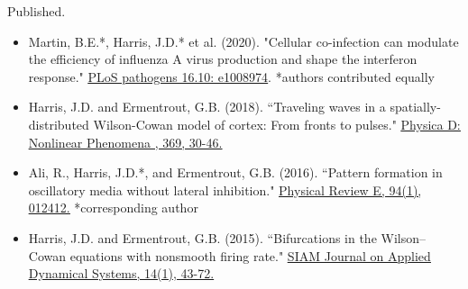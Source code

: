 \documentclass[a4paper,10pt]{article}
\newlength{\cvcolumngapwidth}
\newlength{\cvleftcolumnwidth}
\newlength{\cvrightcolumnwidth}
\newcommand{\cvtitlestyle}[1]{{\large\cvtitlefont\textcolor{cvtitlecolor}{#1}}}
\newcommand{\cvdurationstyle}[1]{{\small\cvdurationfont\textcolor{cvdurationcolor}{#1}}}
\newlength{\cvafteritemskipamount}
\newlength{\cvaftertitleskipamount}
\newlength{\cvparskip}
\newcommand{\cvitem}[2]{
            \begin{minipage}[t]{\cvleftcolumnwidth}
                \raggedleft #1
            \end{minipage}%
            \hspace{\cvcolumngapwidth}%
            \begin{minipage}[t]{\cvrightcolumnwidth}
                \setlength{\parskip}{\cvparskip} #2
            \end{minipage}
        
            \vspace{\cvafteritemskipamount}
        }
\newcommand{\cvtitle}[1]{
            \cvtitlestyle{#1}
        
            \vspace{\cvaftertitleskipamount}
            \vspace{-\cvparskip}
        }
\begin{document}
        
        \cvitem{
            \cvdurationstyle{Published.}
        }{
            \begin{itemize}[leftmargin=*]
                	\item Martin, B.E.*, Harris, J.D.* et al. (2020). "Cellular co-infection can modulate the efficiency of influenza A virus production and shape the interferon response." \href{https://doi.org/10.1371/journal.ppat.1008974}{\underline{PLoS pathogens 16.10: e1008974}}. *authors contributed equally 
        	        \item  Harris, J.D. and Ermentrout, G.B. (2018). ``Traveling waves in a spatially-distributed Wilson-Cowan model of cortex: From fronts to pulses." \href{https://doi.org/10.1016/j.physd.2017.12.011}{\underline{Physica D: Nonlinear Phenomena , 369, 30-46.}}
            \end{itemize}
        }    	
        \cvitem{
            \cvdurationstyle{}
        }{	
        	\newpage
        \begin{itemize}[leftmargin=*]	
                \item Ali, R., Harris, J.D.*, and Ermentrout, G.B. (2016). ``Pattern formation in oscillatory media without lateral inhibition." \href{https://doi.org/10.1103/PhysRevE.94.012412}{\underline{Physical Review E, 94(1), 012412.}}  *corresponding author \\ 
                \item Harris, J.D. and Ermentrout, G.B. (2015). ``Bifurcations in the Wilson--Cowan equations with nonsmooth firing rate." \href{https://doi.org/10.1137/140977953}{\underline{SIAM Journal on Applied Dynamical Systems, 14(1), 43-72. }}
            \end{itemize}
        
        }
        
\end{document}
